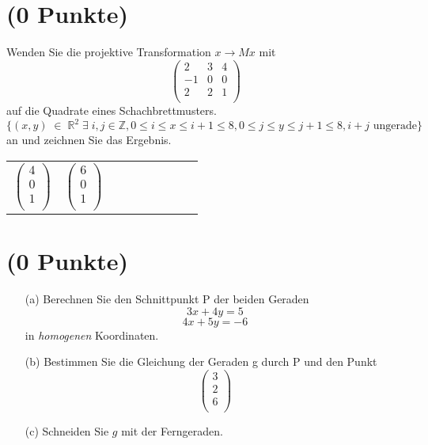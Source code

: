 \documentclass[11pt]{article}
\begin{document}
\section{(0 Punkte)}
Wenden Sie die projektive Transformation $x \rightarrow Mx$ mit
$$
\begin{pmatrix}
2 & 3 & 4\\
-1 & 0 & 0 \\
2 & 2 & 1 \\
\end{pmatrix}
$$
auf die Quadrate eines Schachbrettmusters.\\
$\{ (x, y) \; \in \; \mathbb{R}^{2} \;  \exists \; i, j \in \mathbb{Z}, 0 \leq i \leq x \leq i + 1 \leq 8, 0 \leq j \leq y \leq j + 1 \leq 8, i + j \text{ ungerade} \}$
an und zeichnen Sie das Ergebnis.\\

\begin{tabular}{ccccccccc}
$
\begin{pmatrix}
4\\
0\\
1\\
\end{pmatrix}
$
&
$
\begin{pmatrix}
6\\
0\\
1\\
\end{pmatrix}
$
\end{tabular}

\section{(0 Punkte)}
\begin{enumerate}
\item[(a)] Berechnen Sie den Schnittpunkt P der beiden Geraden
$$3x + 4y = 5$$
$$4x + 5y = -6$$
in \textit{homogenen} Koordinaten.
\item[(b)] Bestimmen Sie die Gleichung der Geraden g durch P und den Punkt
$$
\begin{pmatrix}
3 \\ 2 \\ 6\\
\end{pmatrix}
$$
\item[(c)] Schneiden Sie $g$ mit der Ferngeraden.
\end{enumerate}
\end{document}
